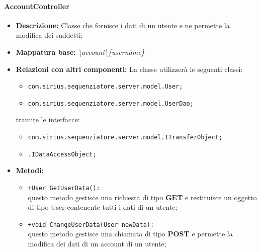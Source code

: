 \paragraph{AccountController}%
\begin{itemize}
	\item \textbf{Descrizione: } Classe che fornisce i dati di un utente e ne permette la modifica dei suddetti;
	\item \textbf{Mappatura base: } \textit{\textbackslash account\textbackslash \{username\}}
	\item \textbf{Relazioni con altri componenti: }
	La classe utilizzerà le seguenti classi:
	\begin{itemize}
		\item \texttt{com.sirius.sequenziatore.server.model.User;}
		\item \texttt{com.sirius.sequenziatore.server.model.UserDao;}
	\end{itemize}
	tramite le interfacce:
	\begin{itemize}
		\item \texttt{com.sirius.sequenziatore.server.model.ITransferObject;}
		\item \texttt{\sModel .IDataAccessObject;}
	\end{itemize}
	\item \textbf{Metodi: }\begin{itemize}
					\item \texttt{+User GetUserData():}\\
					questo metodo gestisce una richiesta di tipo \textbf{GET} e restituisce un oggetto di tipo User contenente tutti i dati di un utente;
					\item \texttt{+void ChangeUserData(User newData):}\\
					questo metodo gestisce una chiamata di tipo \textbf{POST} e permette la modifica dei dati di un account di un utente;
				\end{itemize}
\end{itemize}

